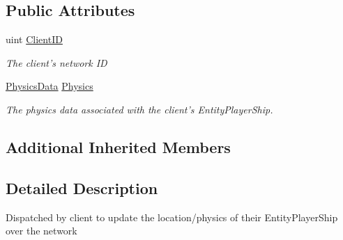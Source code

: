 \subsection*{Public Attributes}
\begin{DoxyCompactItemize}
\item 
uint \hyperlink{class_skyrates_1_1_client_1_1_network_1_1_event_1_1_event_request_set_player_physics_a3d9f5fe43efb702d71021bce4cc8d36a}{Client\-I\-D}
\begin{DoxyCompactList}\small\item\em The client's network I\-D \end{DoxyCompactList}\item 
\hyperlink{class_skyrates_1_1_common_1_1_a_i_1_1_physics_data}{Physics\-Data} \hyperlink{class_skyrates_1_1_client_1_1_network_1_1_event_1_1_event_request_set_player_physics_a634e95d2b9518a9591dbb4c0212a42a4}{Physics}
\begin{DoxyCompactList}\small\item\em The physics data associated with the client's Entity\-Player\-Ship. \end{DoxyCompactList}\end{DoxyCompactItemize}
\subsection*{Additional Inherited Members}


\subsection{Detailed Description}
Dispatched by client to update the location/physics of their Entity\-Player\-Ship over the network 



